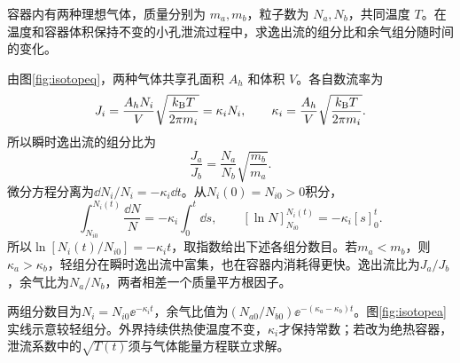 \begin{exercise}[重分子与轻分子的泄流分离]
容器内有两种理想气体，质量分别为 $m_a,m_b$，粒子数为 $N_a,N_b$，共同温度 $T$。在温度和容器体积保持不变的小孔泄流过程中，求逸出流的组分比和余气组分随时间的变化。
\end{exercise}
\begin{solution}
由图\ref{fig:isotopeq}，两种气体共享孔面积 $A_h$ 和体积 $V$。各自数流率为
\[
 J_i=\frac{A_hN_i}{V}\sqrt{\frac{k_{\mathrm B} T}{2\pi m_i}}=\kappa_iN_i,
 \qquad \kappa_i=\frac{A_h}{V}\sqrt{\frac{k_{\mathrm B} T}{2\pi m_i}}.
\]
所以瞬时逸出流的组分比为
\[
 \frac{J_a}{J_b}=\frac{N_a}{N_b}\sqrt{\frac{m_b}{m_a}}.
\]
微分方程分离为$\dd N_i/N_i=-\kappa_i\dd t$。从$N_i(0)=N_{i0}>0$积分，
\[\int_{N_{i0}}^{N_i(t)}\frac{\dd N}{N}
=-\kappa_i\int_0^t\dd s,
\qquad[\ln N]_{N_{i0}}^{N_i(t)}=-\kappa_i[s]_0^t.\]
所以$\ln[N_i(t)/N_{i0}]=-\kappa_it$，取指数给出下述各组分数目。若$m_a<m_b$，则$\kappa_a>\kappa_b$，轻组分在瞬时逸出流中富集，也在容器内消耗得更快。逸出流比为$J_a/J_b$，余气比为$N_a/N_b$，两者相差一个质量平方根因子。

两组分数目为$N_i=N_{i0}\ee^{-\kappa_it}$，余气比值为$(N_{a0}/N_{b0})\ee^{-(\kappa_a-\kappa_b)t}$。图\ref{fig:isotopea}实线示意较轻组分。外界持续供热使温度不变，$\kappa_i$才保持常数；若改为绝热容器，泄流系数中的$\sqrt{T(t)}$须与气体能量方程联立求解。
\end{solution}

